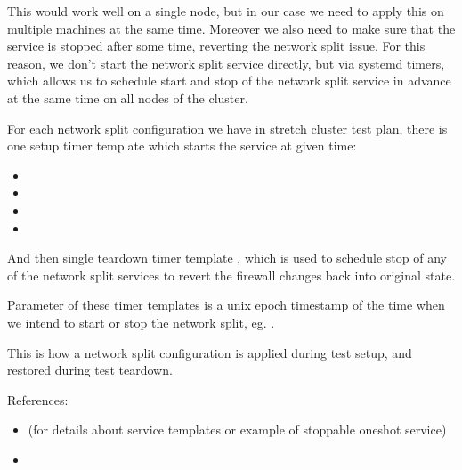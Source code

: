 \documentclass[letterpaper,10pt,english]{sphinxmanual}
\begin{document}
This would work well on a single node, but in our case we need to apply this
on multiple machines at the same time. Moreover we also need to make sure that
the service is stopped after some time, reverting the network split issue.
For this reason, we don’t start the network split service directly, but via
systemd timers, which allows us to schedule start and stop of the network split
service in advance at the same time on all nodes of the cluster.

For each network split configuration we have in stretch cluster test plan,
there is one setup timer template which starts the service at given time:
\begin{itemize}
\item {} 

\item {} 

\item {} 

\item {} 

\end{itemize}

And then single teardown timer template ,
which is used to schedule stop of any of the network split services to revert
the firewall changes back into original state.

Parameter of these timer templates is a unix epoch timestamp of the time when
we intend to start or stop the network split, eg.
.

This is how a network split configuration is applied during test setup,
and restored during test teardown.

References:
\begin{itemize}
\item {} 
(for details about service templates or example of stoppable oneshot service)

\item {} 

\end{itemize}
\end{document}
